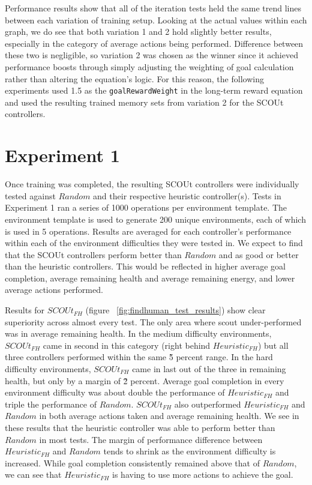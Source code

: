 Performance results show that all of the iteration tests held the same trend lines between each variation of training setup.
Looking at the actual values within each graph, we do see that both variation 1 and 2 hold slightly better results, especially in the category of average actions being performed.
Difference between these two is negligible, so variation 2 was chosen as the winner since it achieved performance boosts through simply adjusting the weighting of goal calculation rather than altering the equation's logic.
For this reason, the following experiments used 1.5 as the \texttt{goalRewardWeight} in the long-term reward equation and used the resulting trained memory sets from variation 2 for the SCOUt controllers.



\section{Experiment 1} \label{sec:experiment1}
Once training was completed, the resulting SCOUt controllers were individually tested against $Random$ and their respective heuristic controller(s).
Tests in Experiment 1 ran a series of 1000 operations per environment template.
The environment template is used to generate 200 unique environments, each of which is used in 5 operations.
Results are averaged for each controller's performance within each of the environment difficulties they were tested in.
We expect to find that the SCOUt controllers perform better than $Random$ and as good or better than the heuristic controllers.
This would be reflected in higher average goal completion, average remaining health and average remaining energy, and lower average actions performed.

Results for $SCOUt_{FH}$ (figure ~\ref{fig:findhuman_test_results}) show clear superiority across almost every test.
The only area where scout under-performed was in average remaining health.
In the medium difficulty environments, $SCOUt_{FH}$ came in second in this category (right behind $Heuristic_{FH}$) but all three controllers performed within the same \~5 percent range.
In the hard difficulty environments, $SCOUt_{FH}$ came in last out of the three in remaining health, but only by a margin of \~2 percent.
Average goal completion in every environment difficulty was about double the performance of $Heuristic_{FH}$ and triple the performance of $Random$.
$SCOUt_{FH}$ also outperformed $Heuristic_{FH}$ and $Random$ in both average actions taken and average remaining health.
We see in these results that the heuristic controller was able to perform better than $Random$ in most tests.
The margin of performance difference between $Heuristic_{FH}$ and $Random$ tends to shrink as the environment difficulty is increased.
While goal completion consistently remained above that of $Random$, we can see that $Heuristic_{FH}$ is having to use more actions to achieve the goal.

